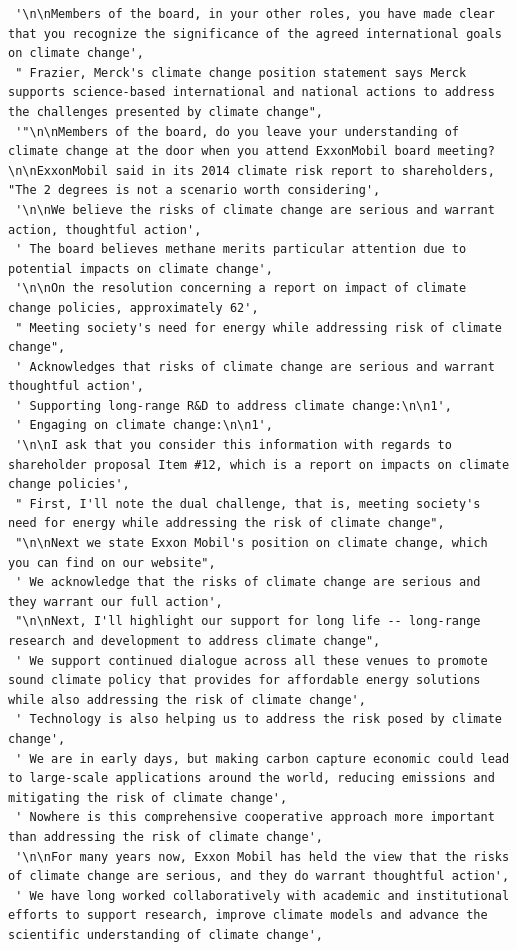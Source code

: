 \documentclass[
  letterpaper,
  DIV=11,
  numbers=noendperiod]{scrreprt}
\begin{document}
\begin{verbatim}
 '\n\nMembers of the board, in your other roles, you have made clear that you recognize the significance of the agreed international goals on climate change',
 " Frazier, Merck's climate change position statement says Merck supports science-based international and national actions to address the challenges presented by climate change",
 '"\n\nMembers of the board, do you leave your understanding of climate change at the door when you attend ExxonMobil board meeting?\n\nExxonMobil said in its 2014 climate risk report to shareholders, "The 2 degrees is not a scenario worth considering',
 '\n\nWe believe the risks of climate change are serious and warrant action, thoughtful action',
 ' The board believes methane merits particular attention due to potential impacts on climate change',
 '\n\nOn the resolution concerning a report on impact of climate change policies, approximately 62',
 " Meeting society's need for energy while addressing risk of climate change",
 ' Acknowledges that risks of climate change are serious and warrant thoughtful action',
 ' Supporting long-range R&D to address climate change:\n\n1',
 ' Engaging on climate change:\n\n1',
 '\n\nI ask that you consider this information with regards to shareholder proposal Item #12, which is a report on impacts on climate change policies',
 " First, I'll note the dual challenge, that is, meeting society's need for energy while addressing the risk of climate change",
 "\n\nNext we state Exxon Mobil's position on climate change, which you can find on our website",
 ' We acknowledge that the risks of climate change are serious and they warrant our full action',
 "\n\nNext, I'll highlight our support for long life -- long-range research and development to address climate change",
 ' We support continued dialogue across all these venues to promote sound climate policy that provides for affordable energy solutions while also addressing the risk of climate change',
 ' Technology is also helping us to address the risk posed by climate change',
 ' We are in early days, but making carbon capture economic could lead to large-scale applications around the world, reducing emissions and mitigating the risk of climate change',
 ' Nowhere is this comprehensive cooperative approach more important than addressing the risk of climate change',
 '\n\nFor many years now, Exxon Mobil has held the view that the risks of climate change are serious, and they do warrant thoughtful action',
 ' We have long worked collaboratively with academic and institutional efforts to support research, improve climate models and advance the scientific understanding of climate change',

\end{verbatim}
\end{document}
